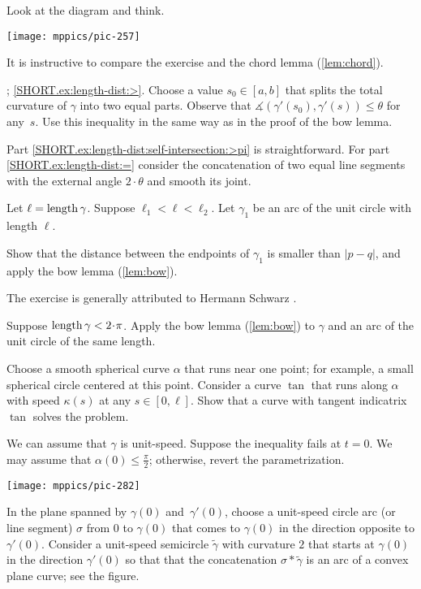 \begin{multicols}{2}
 Look at the diagram and think.

\begin{Figure}
\vskip-0mm
\centering
\texttt{[image: mppics/pic-257]}
\vskip0mm
\end{Figure}

 It is instructive to compare the exercise and the chord lemma (\ref{lem:chord}).

\parbf{\ref{ex:length-dist}}; \ref{SHORT.ex:length-dist:>}.
Choose a value $s_0\in[a,b]$ that splits the total curvature of $\gamma$ into two equal parts.
Observe that $\measuredangle(\gamma'(s_0),\gamma'(s))\le \theta$ for any~$s$.
Use this inequality in the same way as in the proof of the bow lemma.

Part \ref{SHORT.ex:length-dist:self-intersection:>pi} is straightforward.
For part \ref{SHORT.ex:length-dist:=} consider the concatenation of two equal line segments with the external angle $2\cdot\theta$ and smooth its joint. 


Let $\ell=\mathop{\rm length}\nolimits\gamma$.
Suppose $\ell_1<\ell<\ell_2$.
Let $\gamma_1$ be an arc of the unit circle with length $\ell$.

Show that the distance between the endpoints of $\gamma_1$ is smaller than $|p-q|$, and apply the bow lemma (\ref{lem:bow}).

 The exercise is generally attributed to Hermann Schwarz \cite{shur}.


Suppose $\length\gamma<2\cdot\pi$. 
Apply the bow lemma (\ref{lem:bow}) to $\gamma$ and an arc of the unit circle of the same length.

Choose a smooth spherical curve $\alpha$ that runs near one point;
for example, a small spherical circle centered at this point.
Consider a curve $\tan$ that runs along $\alpha$ with speed $\kappa(s)$ at any $s\in [0,\ell]$.
Show that a curve with tangent indicatrix $\tan$ solves the problem.

We can assume that $\gamma$ is unit-speed.
Suppose the inequality fails at $t=0$.
We may assume that $\alpha(0)\le\tfrac\pi2$;
otherwise, revert the parametrization.

\begin{Figure}
\vskip-1mm
\centering
\texttt{[image: mppics/pic-282]}
\vskip-1mm
\end{Figure}

In the plane spanned by $\gamma(0)$ and~$\gamma'(0)$, choose a unit-speed circle arc (or line segment) $\sigma$ from $0$ to $\gamma(0)$ that comes to $\gamma(0)$ in the direction opposite to $\gamma'(0)$.
Consider a unit-speed semicircle $\tilde\gamma$ with curvature $2$
that starts at $\gamma(0)$ in the direction $\gamma'(0)$ so that that the concatenation $\sigma*\tilde\gamma$ is an arc of a convex plane curve; see the figure.


\end{multicols}
